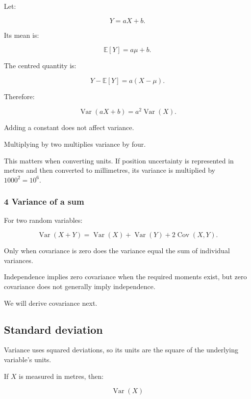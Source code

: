\hypertarget{02-foundations-ii-ch023-variance-under-scaling-and-translation}{}

Let:

\[
 Y=aX+b.
\]

Its mean is:

\[
 \mathbb E[Y]=a\mu+b.
\]

The centred quantity is:

\[
 Y-\mathbb E[Y]=a(X-\mu).
\]

Therefore:

\[
 \boxed{ \operatorname{Var}(aX+b)=a^2\operatorname{Var}(X) }.
\]

Adding a constant does not affect variance.

Multiplying by two multiplies variance by four.

This matters when converting units. If position uncertainty is represented in metres and then converted to millimetres, its variance is multiplied by \(1000^2=10^6\).

\subsubsection{4 Variance of a sum}\label{02-foundations-ii-ch023-variance-of-a-sum}

\hypertarget{02-foundations-ii-ch023-variance-of-a-sum}{}

For two random variables:

\[
 \operatorname{Var}(X+Y) = \operatorname{Var}(X)+ \operatorname{Var}(Y)+ 2\operatorname{Cov}(X,Y).
\]

Only when covariance is zero does the variance equal the sum of individual variances.

Independence implies zero covariance when the required moments exist, but zero covariance does not generally imply independence.

We will derive covariance next.

\subsection{Standard deviation}\label{02-foundations-ii-ch023-standard-deviation}

\hypertarget{02-foundations-ii-ch023-standard-deviation}{}

Variance uses squared deviations, so its units are the square of the underlying variable's units.

If \(X\) is measured in metres, then:

\[
 \operatorname{Var}(X)
\]

